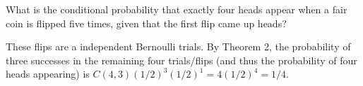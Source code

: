 \documentclass[../main.tex]{subfiles}
\begin{document}
What is the conditional probability that exactly four heads appear when a fair coin is flipped five times, given that the first flip came up heads?

\solution
These flips are a independent Bernoulli trials.
By Theorem 2, the probability of three successes in the remaining four trials/flips (and thus the probability of four heads appearing) is
\(
C(4, 3)(1/2)^3(1/2)^1 = 4(1/2)^4 = 1/4.
\)
\end{document}
